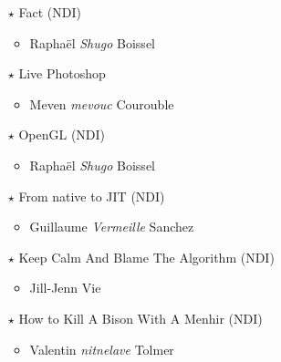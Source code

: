 \documentclass[a4paper]{article}
\begin{document}
\begin{multicols*}{2}
\begin{itemize}
            \vspace{0.3cm}

        \item[$\star$] Fact (NDI)
            \begin{itemize}
                \item Raphaël \emph{Shugo} Boissel
            \end{itemize}

            \vspace{0.3cm}

        \item[$\star$] Live Photoshop
            \begin{itemize}
                \item Meven \emph{mevouc} Courouble
            \end{itemize}

            \vspace{0.3cm}

        \item[$\star$] OpenGL (NDI)
            \begin{itemize}
                \item Raphaël \emph{Shugo} Boissel
            \end{itemize}

            \vspace{0.3cm}

        \item[$\star$] From native to JIT (NDI)
            \begin{itemize}
                \item Guillaume \emph{Vermeille} Sanchez
            \end{itemize}

            \vspace{0.3cm}

        \item[$\star$] Keep Calm And Blame The Algorithm (NDI)
            \begin{itemize}
                \item Jill-Jenn Vie
            \end{itemize}

            \vspace{0.3cm}

        \item[$\star$] How to Kill A Bison With A Menhir (NDI)
            \begin{itemize}
                \item Valentin \emph{nitnelave} Tolmer
            \end{itemize}


\end{itemize}
\end{multicols*}
\end{document}
